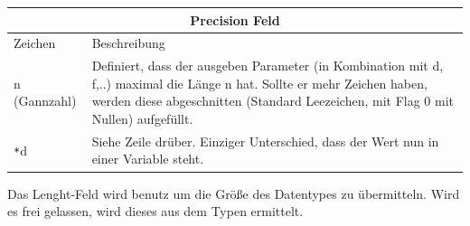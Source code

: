 \documentclass[a4paper,10pt]{article}
\begin{document}
\begin{center}
    \begin{tabularx}{\textwidth}{|l|X|}

        \hline
        \multicolumn{2}{|c|}{Precision Feld} \\
        \hline
            Zeichen   & Beschreibung\\
        \hline
            n (Gannzahl)    &   Definiert, dass der ausgeben Parameter (in
                            Kombination mit d, f,..) maximal die Länge n hat. Sollte er mehr Zeichen haben, werden diese abgeschnitten (Standard Leezeichen, mit Flag 0 mit Nullen) aufgefüllt.\\ 
            \verb|*|d      &  Siehe Zeile drüber. Einziger Unterschied, dass der
                            Wert nun in einer Variable steht.\\ 
        \hline
    \end{tabularx}
\end{center}
Das Lenght-Feld wird benutz um die Größe des Datentypes zu übermitteln. Wird es frei gelassen, wird dieses aus dem Typen ermittelt.
\end{document}
